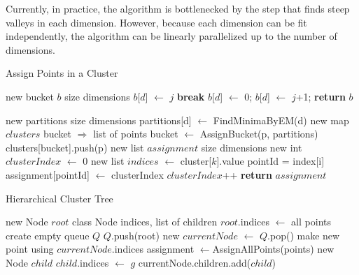 \documentclass{acm_proc_article-sp}
\begin{document}
Currently, in practice, the algorithm is bottlenecked by the step that finds steep valleys in each dimension. However, because each dimension can be fit independently, the algorithm can be linearly parallelized up to the number of dimensions. 

\begin{algorithm}
\caption{Assign Points in a Cluster}\label{euclid}
\begin{algorithmic}[1]
\State new bucket $b$ \Comment size dimensions
\State $b$[$d$] $\leftarrow$ $j$
\State \textbf{break}
\EndIf
{}
\State $b$[$d$] $\leftarrow$ 0;
\Else
\State $b$[$d$] $\leftarrow$ $j$+1;
\EndIf
\EndFor
\EndFor
\State \textbf{return} $b$
\EndProcedure
\State

\State new partitions \Comment size dimensions
\State partitions[d] $\leftarrow$ FindMinimaByEM(d)
\EndFor
\State new map $clusters$ \Comment bucket $\Rightarrow$ list of points
\State bucket $\leftarrow$ AssignBucket(p, partitions)
\State clusters[bucket].push(p)
\EndFor
\State new list $assignment$ \Comment size dimensions
\State new int $clusterIndex$ $\leftarrow$ 0
\State new list $indices$ $\leftarrow$ cluster[$k$].value
\State pointId = index[i] 
\State assignment[pointId] $\leftarrow$  clusterIndex
\EndFor
\State $clusterIndex$++
\EndFor
\State \textbf{return} $assignment$
\EndProcedure
\end{algorithmic}
\end{algorithm}


\begin{algorithm}
\caption{Hierarchical Cluster Tree}\label{hct}
\begin{algorithmic}[1]
\State new Node $root$ \Comment class Node indices, list of children
\State $root$.indices $\leftarrow$ all points
\State create empty queue $Q$
\State $Q$.push(root)
\State new $currentNode$ $\leftarrow$ $Q$.pop()
\State make new point using $currentNode$.indices
\State assignment $\leftarrow $AssignAllPoints(points)
\State new Node $child$
\State $child$.indices $\leftarrow$ $g$
\State currentNode.children.add($child$)
\EndFor
\EndWhile
\EndProcedure
\end{algorithmic}
\end{algorithm}
\end{document}
